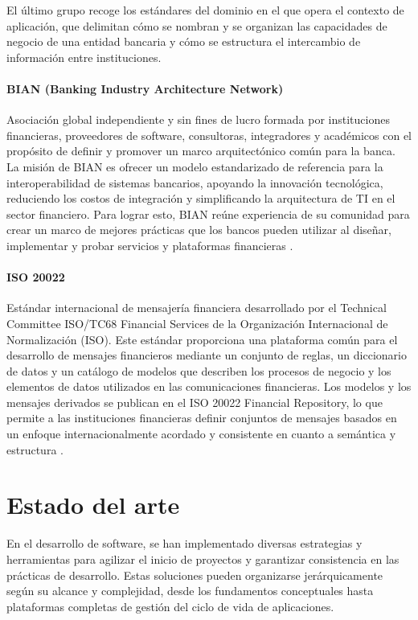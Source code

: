 El último grupo recoge los estándares del dominio en el que opera el
contexto de aplicación, que delimitan cómo se nombran y se organizan las
capacidades de negocio de una entidad bancaria y cómo se estructura el
intercambio de información entre instituciones.
\paragraph*{BIAN (Banking Industry Architecture Network)}
Asociación global independiente y sin fines de lucro formada por instituciones financieras, proveedores de software, consultoras, integradores y académicos con el propósito de definir y promover un marco arquitectónico común para la banca. La misión de BIAN es ofrecer un modelo estandarizado de referencia para la interoperabilidad de sistemas bancarios, apoyando la innovación tecnológica, reduciendo los costos de integración y simplificando la arquitectura de TI en el sector financiero. Para lograr esto, BIAN reúne experiencia de su comunidad para crear un marco de mejores prácticas que los bancos pueden utilizar al diseñar, implementar y probar servicios y plataformas financieras \citep{bian-2026}.
\paragraph*{ISO 20022}
Estándar internacional de mensajería financiera desarrollado por el Technical Committee ISO/TC68 Financial Services de la Organización Internacional de Normalización (ISO). Este estándar proporciona una plataforma común para el desarrollo de mensajes financieros mediante un conjunto de reglas, un diccionario de datos y un catálogo de modelos que describen los procesos de negocio y los elementos de datos utilizados en las comunicaciones financieras. Los modelos y los mensajes derivados se publican en el ISO 20022 Financial Repository, lo que permite a las instituciones financieras definir conjuntos de mensajes basados en un enfoque internacionalmente acordado y consistente en cuanto a semántica y estructura \citep{iso20022-2026}.

\section{Estado del arte}
\label{sec:estado-del-arte}
En el desarrollo de software, se han implementado diversas estrategias y herramientas para agilizar el inicio de proyectos y garantizar consistencia en las prácticas de desarrollo. Estas soluciones pueden organizarse jerárquicamente según su alcance y complejidad, desde los fundamentos conceptuales hasta plataformas completas de gestión del ciclo de vida de aplicaciones.

